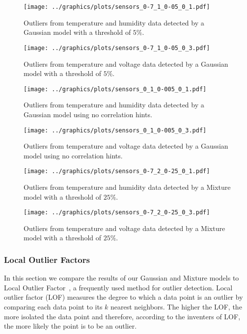 \begin{figure}[h]
\centering
\texttt{[image: ../graphics/plots/sensors\_0-7\_1\_0-05\_0\_1.pdf]}
\caption{Outliers from temperature and humidity data detected by a Gaussian model with a threshold of $5\%$.}
\label{fig:sensors_0.7_1_0.05_0_1}
\end{figure}
\begin{figure}[h]
\centering
\texttt{[image: ../graphics/plots/sensors\_0-7\_1\_0-05\_0\_3.pdf]}
\caption{Outliers from temperature and voltage data detected by a Gaussian model with a threshold of $5\%$.}
\label{fig:sensors_0.7_1_0.05_0_3}
\end{figure}

\begin{figure}[h]
\centering
\texttt{[image: ../graphics/plots/sensors\_0\_1\_0-005\_0\_1.pdf]}
\caption{Outliers from temperature and humidity data detected by a Gaussian model using no correlation hints.}
\label{fig:sensors_0_1_0.05_0_1}
\end{figure}
\begin{figure}[h]
\centering
\texttt{[image: ../graphics/plots/sensors\_0\_1\_0-005\_0\_3.pdf]}
\caption{Outliers from temperature and voltage data detected by a Gaussian model using no correlation hints.}
\label{fig:sensors_0_1_0.05_0_3}
\end{figure}

\begin{figure}[h]
\centering
\texttt{[image: ../graphics/plots/sensors\_0-7\_2\_0-25\_0\_1.pdf]}
\caption{Outliers from temperature and humidity data detected by a Mixture model with a threshold of $25\%$.}
\label{fig:sensors_0.7_2_0.25_0_1}
\end{figure}
\begin{figure}[h]
\centering
\texttt{[image: ../graphics/plots/sensors\_0-7\_2\_0-25\_0\_3.pdf]}
\caption{Outliers from temperature and voltage data detected by a Mixture model with a threshold of $25\%$.}
\label{fig:sensors_0.7_2_0.25_0_3}
\end{figure}

\subsubsection{Local Outlier Factors}
\label{sec:lof-evaluation}

In this section we compare the results of our Gaussian and Mixture models to Local Outlier Factor~\cite{Breunig2000}, a frequently used method for outlier detection.
Local outlier factor (LOF) measures the degree to which a data point is an outlier by comparing each data point to its $k$ nearest neighbors.
The higher the LOF, the more isolated the data point and therefore, according to the inventers of LOF, the more likely the point is to be an outlier.

